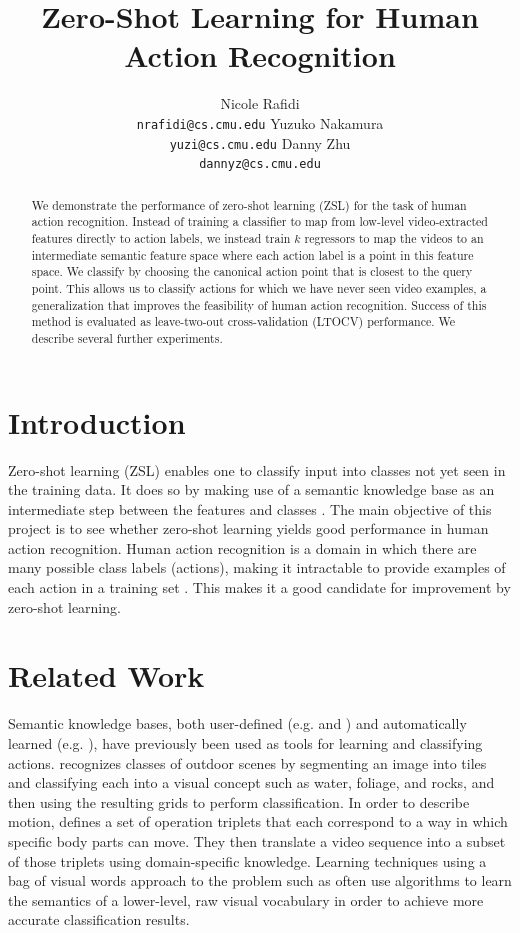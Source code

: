 \documentclass{article}
\title{Zero-Shot Learning for Human Action Recognition}
\author{Nicole Rafidi \\
  \texttt{nrafidi@cs.cmu.edu}
  \And
  Yuzuko Nakamura \\
  \texttt{yuzi@cs.cmu.edu}
  \And
  Danny Zhu \\
  \texttt{dannyz@cs.cmu.edu}
}
\begin{document}
\maketitle

\begin{abstract}
We demonstrate the performance of zero-shot learning (ZSL) for the task of human action recognition. Instead of training a classifier to map from low-level video-extracted features directly to action labels, we instead train $k$ regressors to map the videos to an intermediate semantic feature space where each action label is a point in this feature space. We classify by choosing the canonical action point that is closest to the query point. This allows us to classify actions for which we have never seen video examples, a generalization that improves the feasibility of human action recognition. Success of this method is evaluated as leave-two-out cross-validation (LTOCV) performance. We describe several further experiments.
\end{abstract}

\section{Introduction}
Zero-shot learning (ZSL) enables one to classify input into classes not yet seen in the training data. It does so by making use of a semantic knowledge base as an intermediate step between the features and classes \cite{Palatucci09}. The main objective of this project is to see whether zero-shot learning yields good performance in human action recognition. Human action recognition is a domain in which there are many possible class labels (actions), making it intractable to provide examples of each action in a training set \cite{Poppe10}. This makes it a good candidate for improvement by zero-shot learning.

\section{Related Work}
Semantic knowledge bases, both user-defined (e.g. \cite{Vogel07} and \cite{Park04}) and automatically learned (e.g. \cite{Zhao10}), have previously been used as tools for learning and classifying actions. \cite{Vogel07} recognizes classes of outdoor scenes by segmenting an image into tiles and classifying each into a visual concept such as water, foliage, and rocks, and then using the resulting grids to perform classification. In order to describe motion, \cite{Park04} defines a set of operation triplets that each correspond to a way in which specific body parts can move. They then translate a video sequence into a subset of those triplets using domain-specific knowledge. Learning techniques using a bag of visual words approach to the problem such as \cite{Zhao10} often use algorithms to learn the semantics of a lower-level, raw visual vocabulary in order to achieve more accurate classification results.
\end{document}
